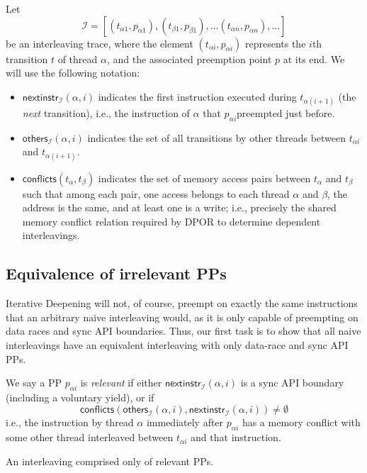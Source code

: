 \newcommand\ppinstr[3]{\ensuremath{\mathsf{nextinstr}_{#1}(#2,#3)}}
\newcommand\ppothers[3]{\ensuremath{\mathsf{others}_{#1}(#2,#3)}}
\newcommand\pppfx[2]{\ensuremath{\mathsf{pfx}(#1,#2)}}
\newcommand\conflicts[2]{\ensuremath{\mathsf{conflicts}(#1,#2)}}
\newcommand\pai{\ensuremath{p_{\alpha{}i}}}
\newcommand\tai{\ensuremath{t_{\alpha{}i}}}
Let
\[
	\mathcal{I} = [ (t_{\alpha{}1}, p_{\alpha{}1}), (t_{\beta{}1}, p_{\beta{}1}), ... (t_{\alpha{}n}, p_{\alpha{}n}), ... ]
\]
be an interleaving trace, where the element $(\tai, \pai)$ represents the $i$th transition $t$ of thread $\alpha$, and the associated preemption point $p$ at its end.
We will use the following notation:
\begin{itemize}
	\item $\ppinstr{\mathcal{I}}{\alpha}{i}$ indicates the first instruction executed during $t_{\alpha{}(i+1)}$ (the {\em next} transition), i.e., the instruction of $\alpha$ that \pai preempted just before.
	\item $\ppothers{\mathcal{I}}{\alpha}{i}$ indicates the set of all transitions by other threads between $\tai$ and $t_{\alpha{}(i+1)}$.
	\item $\conflicts{t_\alpha}{t_\beta}$ indicates the set of memory access pairs between $t_\alpha$ and $t_\beta$ such that among each pair, one access belongs to each thread $\alpha$ and $\beta$, the address is the same, and at least one is a write; i.e., precisely the shared memory conflict relation required by DPOR to determine dependent interleavings.
\end{itemize}


\subsection{Equivalence of irrelevant PPs}

Iterative Deepening will not, of course, preempt on exactly the same instructions that an arbitrary naive interleaving would,
as it is only capable of preempting on data races and sync API boundaries.
Thus, our first task is to show that all naive interleavings have an equivalent interleaving with only data-race and sync API PPs.

\begin{definition}
	We say a PP $\pai$ is {\em relevant} if either $\ppinstr{\mathcal{I}}{\alpha}{i}$ is a sync API boundary (including a voluntary yield),
	or if
	\[
		\conflicts{\ppothers{\mathcal{I}}{\alpha}{i}}{\ppinstr{\mathcal{I}}{\alpha}{i}} \ne \emptyset
	\]
	i.e., the instruction by thread $\alpha$ immediately after $\pai$ has a memory conflict with some other thread interleaved between $\tai$ and that instruction.
\end{definition}
\begin{definition}
	An interleaving comprised only of relevant PPs.
\end{definition}

